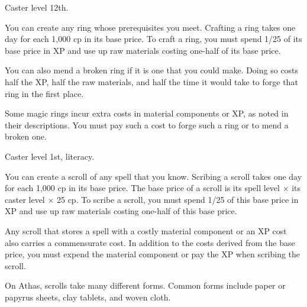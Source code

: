{Caster level 12th.}
{You can create any ring whose prerequisites you meet. Crafting a ring takes one day for each 1,000 cp in its base price. To craft a ring, you must spend 1/25 of its base price in XP and use up raw materials costing one-half of its base price.

You can also mend a broken ring if it is one that you could make. Doing so costs half the XP, half the raw materials, and half the time it would take to forge that ring in the first place.

Some magic rings incur extra costs in material components or XP, as noted in their descriptions. You must pay such a cost to forge such a ring or to mend a broken one.}



{}
{Caster level 1st, literacy.}
{You can create a scroll of any spell that you know. Scribing a scroll takes one day for each 1,000 cp in its base price. The base price of a scroll is its spell level $\times$ its caster level $\times$ 25 cp. To scribe a scroll, you must spend 1/25 of this base price in XP and use up raw materials costing one-half of this base price.

Any scroll that stores a spell with a costly material component or an XP cost also carries a commensurate cost. In addition to the costs derived from the base price, you must expend the material component or pay the XP when scribing the scroll.}
{}
{On Athas, scrolls take many different forms. Common forms include paper or papyrus sheets, clay tablets, and woven cloth.}

